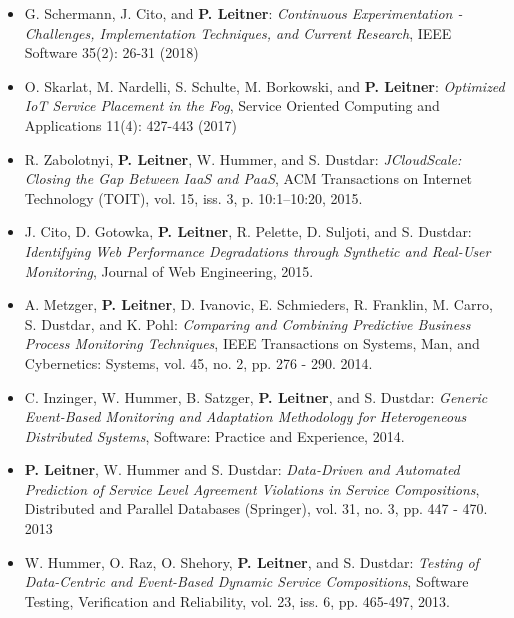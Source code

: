 \documentclass[paper=letter,fontsize=11pt]{scrartcl} %
\begin{document}
\begin{itemize}
\begin{shaded}
		\end{shaded}
	\item  G. Schermann, J. Cito, and \textbf{P. Leitner}: \emph{Continuous Experimentation - Challenges, Implementation Techniques, and Current Research},  IEEE Software 35(2): 26-31 (2018)
	\item  O. Skarlat, M. Nardelli, S. Schulte, M. Borkowski, and \textbf{P. Leitner}: \emph{Optimized IoT Service Placement in the Fog}, Service Oriented Computing and Applications 11(4): 427-443 (2017)
  \item  R. Zabolotnyi, \textbf{P. Leitner}, W. Hummer, and S. Dustdar: \emph{JCloudScale: Closing the Gap Between IaaS and PaaS}, ACM Transactions on Internet Technology (TOIT),  vol. 15, iss. 3, p. 10:1–10:20, 2015.
  \item J. Cito, D. Gotowka, \textbf{P. Leitner}, R. Pelette, D. Suljoti, and S. Dustdar: \emph{Identifying Web Performance Degradations through Synthetic and Real-User Monitoring}, Journal of Web Engineering, 2015.
  \item  A. Metzger, \textbf{P. Leitner}, D. Ivanovic, E. Schmieders, R. Franklin, M. Carro, S. Dustdar, and K. Pohl: \emph{Comparing and Combining Predictive Business Process Monitoring Techniques}, IEEE Transactions on Systems, Man, and Cybernetics: Systems, vol. 45, no. 2, pp. 276 - 290. 2014.
  \item C. Inzinger, W. Hummer, B. Satzger, \textbf{P. Leitner}, and S. Dustdar: \emph{Generic Event-Based Monitoring and Adaptation Methodology for Heterogeneous Distributed Systems}, Software: Practice and Experience, 2014.
  \item \textbf{P. Leitner}, W. Hummer and S. Dustdar: \emph{Data-Driven and Automated Prediction of Service Level Agreement Violations in Service Compositions}, Distributed and Parallel Databases (Springer), vol. 31, no. 3, pp. 447 - 470. 2013
  \item W. Hummer, O. Raz, O. Shehory, \textbf{P. Leitner}, and S. Dustdar: \emph{Testing of Data-Centric and Event-Based Dynamic Service Compositions}, Software Testing, Verification and Reliability, vol. 23, iss. 6, pp. 465-497, 2013.
  \begin{shaded}

\end{shaded}
\end{itemize}
\end{document}
